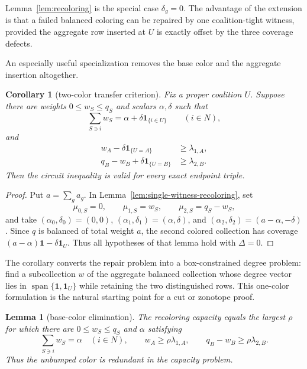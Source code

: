 \documentclass[11pt]{article}
\newtheorem{lemma}[theorem]{Lemma}
\newtheorem{corollary}[theorem]{Corollary}
\begin{document}
Lemma~\ref{lem:recoloring} is the special case $\delta_g=0$. The advantage of
the extension is that a failed balanced coloring can be repaired by one
coalition-tight witness, provided the aggregate row inserted at $U$ is
exactly offset by the three coverage defects.

An especially useful specialization removes the base color and the aggregate
insertion altogether.

\begin{corollary}[two-color transfer criterion]
\label{cor:two-color-transfer}
Fix a proper coalition $U$. Suppose there are weights
$0\leq w_S\leq q_S$ and scalars $\alpha,\delta$ such that
\[
 \sum_{S\ni i}w_S=\alpha+\delta\mathbf1_{\{i\in U\}}
 \qquad(i\in N),
\]
and
\begin{align*}
 w_A-\delta\mathbf1_{\{U=A\}}&\geq\lambda_{1,A},\\
 q_B-w_B+\delta\mathbf1_{\{U=B\}}&\geq\lambda_{2,B}.
\end{align*}
Then the circuit inequality is valid for every exact endpoint triple.
\end{corollary}

\begin{proof}
Put $a=\sum_ga_g$. In
Lemma~\ref{lem:single-witness-recoloring}, set
\[
 \mu_{0,S}=0,\qquad \mu_{1,S}=w_S,\qquad
 \mu_{2,S}=q_S-w_S,
\]
and take $(\alpha_0,\delta_0)=(0,0)$,
$(\alpha_1,\delta_1)=(\alpha,\delta)$, and
$(\alpha_2,\delta_2)=(a-\alpha,-\delta)$. Since $q$ is balanced of total
weight $a$, the second colored collection has coverage
$(a-\alpha)\mathbf1-\delta\mathbf1_U$. Thus all hypotheses of that lemma
hold with $\Delta=0$.
\end{proof}

The corollary converts the repair problem into a box-constrained degree
problem: find a subcollection $w$ of the aggregate balanced collection whose
degree vector lies in $\operatorname{span}\{\mathbf1,\mathbf1_U\}$ while
retaining the two distinguished rows. This one-color formulation is the
natural starting point for a cut or zonotope proof.

\begin{lemma}[base-color elimination]
\label{lem:base-color-elimination}
The recoloring capacity equals the largest $\rho$ for which there are
$0\leq w_S\leq q_S$ and $\alpha$ satisfying
\[
 \sum_{S\ni i}w_S=\alpha\quad(i\in N),\qquad
 w_A\geq\rho\lambda_{1,A},\qquad
 q_B-w_B\geq\rho\lambda_{2,B}.
\]
Thus the unbumped color is redundant in the capacity problem.
\end{lemma}
\end{document}
